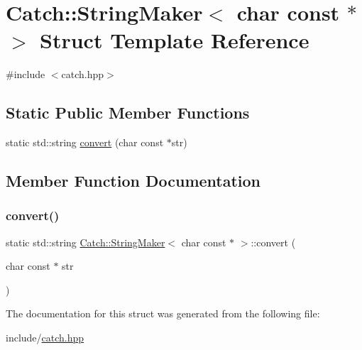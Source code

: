 \hypertarget{struct_catch_1_1_string_maker_3_01char_01const_01_5_01_4}{}\section{Catch\+::String\+Maker$<$ char const $\ast$ $>$ Struct Template Reference}
\label{struct_catch_1_1_string_maker_3_01char_01const_01_5_01_4}


{\ttfamily \#include $<$catch.\+hpp$>$}

\subsection*{Static Public Member Functions}
\begin{DoxyCompactItemize}
\item 
static std\+::string \mbox{\hyperlink{struct_catch_1_1_string_maker_3_01char_01const_01_5_01_4_a20813965ad59cdf6d1f874f47158432d}{convert}} (char const $\ast$str)
\end{DoxyCompactItemize}


\subsection{Member Function Documentation}
\mbox{\label{struct_catch_1_1_string_maker_3_01char_01const_01_5_01_4_a20813965ad59cdf6d1f874f47158432d}} 
\subsubsection{\texorpdfstring{convert()}{convert()}}
{\footnotesize\ttfamily static std\+::string \mbox{\hyperlink{struct_catch_1_1_string_maker}{Catch\+::\+String\+Maker}}$<$ char const $\ast$ $>$\+::convert (\begin{DoxyParamCaption}\item[{char const $\ast$}]{str }\end{DoxyParamCaption})\hspace{0.3cm}{\ttfamily [static]}}



The documentation for this struct was generated from the following file\+:\begin{DoxyCompactItemize}
\item 
include/\mbox{\hyperlink{catch_8hpp}{catch.\+hpp}}\end{DoxyCompactItemize}
